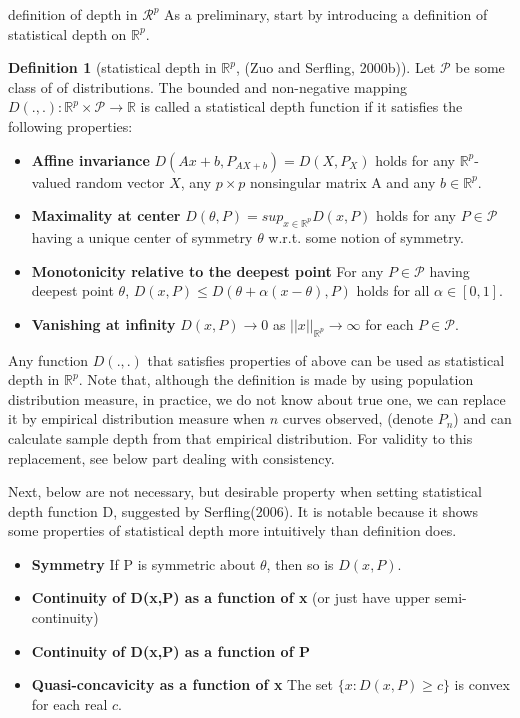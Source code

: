 \documentclass[aspectratio=169,ignorenonframetext,9pt]{beamer}
\theoremstyle{plain}
\theoremstyle{definition}
\newtheorem{defn}{Definition}[section]
\begin{document}
\begin{frame}{definition of depth in $\mathcal{R}^p$}
    As a preliminary, start by introducing a definition of statistical depth on $\mathbb{R}^p$.


\begin{defn}[statistical depth in $\mathbb{R}^p$, (Zuo and Serfling, 2000b)]
Let $\mathcal{P}$ be some class of of distributions.
The bounded and non-negative mapping $D(.,.): \mathbb{R}^p\times \mathcal{P} \rightarrow \mathbb{R}$ is called
a statistical depth function if it satisfies the following properties:
\begin{itemize}
    \item \textbf{Affine invariance}
        $D(Ax+b,P_{AX+b})=D(X,P_X)$ holds for any $\mathbb{R}^p$-valued random vector $X$,
        any $p\times p$ nonsingular matrix A and any $b\in \mathbb{R}^p$.
    \item \textbf{Maximality at center}
        $D(\theta,P)=sup_{x\in\mathbb{R}^p}D(x,P)$ holds for any $P\in\mathcal{P}$
        having a unique center of symmetry $\theta$ w.r.t. some notion of symmetry.
    \item \textbf{Monotonicity relative to the deepest point}
        For any $P \in \mathcal{P}$ having deepest point $\theta$, $D(x,P)\leq D(\theta+\alpha(x-\theta), P)$
        holds for all $\alpha\in[0,1]$.
    \item \textbf{Vanishing at infinity}
        $D(x,P)\rightarrow0$ as $||x||_{\mathbb{R}^p}\rightarrow\infty$
        for each $P\in\mathcal{P}$.
\end{itemize}
\end{defn}


Any function $D(.,.)$ that satisfies properties of above can be used as statistical depth in $\mathbb{R}^p$.
Note that, although the definition is made by using population distribution measure, 
in practice, we do not know about true one, we can replace it by empirical distribution measure when $n$ curves observed,
(denote $P_n$) and can calculate sample depth from that empirical distribution. 
For validity to this replacement, see below part dealing with consistency.


Next, below are not necessary, but desirable property when setting statistical depth function D, 
suggested by Serfling(2006). It is notable because it shows some properties of statistical depth more intuitively than definition does.
\begin{itemize}
    \item \textbf{Symmetry}
        If P is symmetric about $\theta$, then so is $D(x,P)$.
    \item \textbf{Continuity of D(x,P) as a function of x}
        (or just have upper semi-continuity)
    \item \textbf{Continuity of D(x,P) as a function of P}
    \item \textbf{Quasi-concavicity as a function of x}
        The set $\{x:D(x,P)\geq c\}$ is convex for each real $c$.
\end{itemize}


\end{frame}
\end{document}
